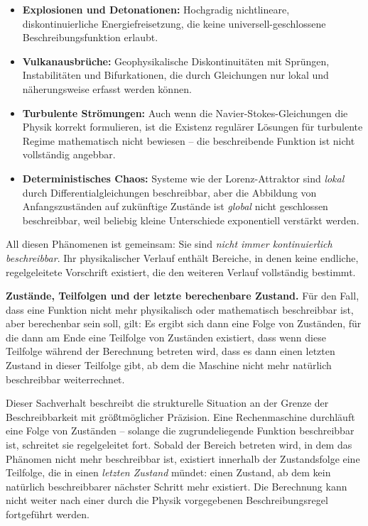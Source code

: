 ﻿\documentclass[12pt, a4paper]{article}
\begin{document}
	\begin{itemize}
		\item \textbf{Explosionen und Detonationen:} Hochgradig nichtlineare, diskontinuierliche Energiefreisetzung, die keine universell-geschlossene Beschreibungsfunktion erlaubt.
		\item \textbf{Vulkanausbrüche:} Geophysikalische Diskontinuitäten mit Sprüngen, Instabilitäten und Bifurkationen, die durch Gleichungen nur lokal und näherungsweise erfasst werden können.
		\item \textbf{Turbulente Strömungen:} Auch wenn die Navier-Stokes-Gleichungen die Physik korrekt formulieren, ist die Existenz regulärer Lösungen für turbulente Regime mathematisch nicht bewiesen -- die beschreibende Funktion ist nicht vollständig angebbar.
		\item \textbf{Deterministisches Chaos:} Systeme wie der Lorenz-Attraktor sind \textit{lokal} durch Differentialgleichungen beschreibbar, aber die Abbildung von Anfangszuständen auf zukünftige Zustände ist \textit{global} nicht geschlossen beschreibbar, weil beliebig kleine Unterschiede exponentiell verstärkt werden.
	\end{itemize}

	All diesen Phänomenen ist gemeinsam: Sie sind \textit{nicht immer kontinuierlich beschreibbar}. Ihr physikalischer Verlauf enthält Bereiche, in denen keine endliche, regelgeleitete Vorschrift existiert, die den weiteren Verlauf vollständig bestimmt.

	\textbf{Zustände, Teilfolgen und der letzte berechenbare Zustand.}
	Für den Fall, dass eine Funktion nicht mehr physikalisch oder mathematisch beschreibbar ist, aber berechenbar sein soll, gilt: Es ergibt sich dann eine Folge von Zuständen, für die dann am Ende eine Teilfolge von Zuständen existiert, dass wenn diese Teilfolge während der Berechnung betreten wird, dass es dann einen letzten Zustand in dieser Teilfolge gibt, ab dem die Maschine nicht mehr natürlich beschreibbar weiterrechnet.

	Dieser Sachverhalt beschreibt die strukturelle Situation an der Grenze der Beschreibbarkeit mit größtmöglicher Präzision. Eine Rechenmaschine durchläuft eine Folge von Zuständen -- solange die zugrundeliegende Funktion beschreibbar ist, schreitet sie regelgeleitet fort. Sobald der Bereich betreten wird, in dem das Phänomen nicht mehr beschreibbar ist, existiert innerhalb der Zustandsfolge eine Teilfolge, die in einen \textit{letzten Zustand} mündet: einen Zustand, ab dem kein natürlich beschreibbarer nächster Schritt mehr existiert. Die Berechnung kann nicht weiter nach einer durch die Physik vorgegebenen Beschreibungsregel fortgeführt werden.
\end{document}
